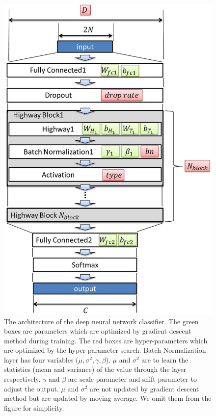\documentclass[proof]{pasj01}
\begin{document}
\begin{figure}[htbp]
  \begin{center}
     \includegraphics[width=130mm]{figures/model_all.eps}
  \end{center}
  \caption{\label{dnnmodel}
  The architecture of the deep neural network classifier. 
  The green boxes are parameters which are optimized by gradient descent method during training. The red boxes are hyper-parameters which are optimized by the hyper-parameter search. 
  Batch Normalization layer has four variables ($\mu, \sigma^2, \gamma, \beta$). $\mu$ and $\sigma^2$ are to learn the statistics (mean and variance) of the value through the layer respectively.  $\gamma$ and $\beta$ are scale parameter and shift parameter to adjust the output. $\mu$ and $\sigma^2$ are not updated by gradient descent method but are updated by moving average. We omit them from the figure for simplicity.
  }%
  \label{fig:dnn_model}
\end{figure}
%
\end{document}
